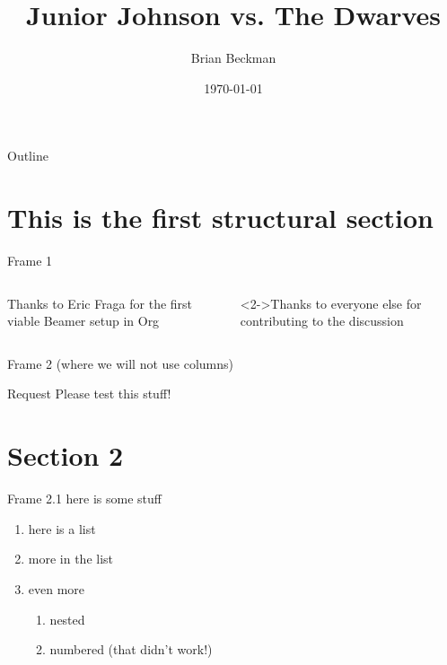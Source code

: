 \documentclass[presentation]{beamer}
\author{Brian Beckman}
\date{\today}
\title{Junior Johnson vs. The Dwarves}
\begin{document}
\maketitle
\begin{frame}{Outline}
\tableofcontents
\end{frame}


\section{This is the first structural section}
\label{sec:org176f1c9}

\begin{frame}[label={sec:orgf76da37}]{Frame 1}
\begin{columns}
\begin{column}{0.48\columnwidth}
\begin{block}{Thanks to Eric Fraga}
for the first viable Beamer setup in Org
\end{block}
\end{column}
\begin{column}{0.48\columnwidth}
\begin{block}<2->{Thanks to everyone else}
for contributing to the discussion
\end{block}
\end{column}
\end{columns}
\end{frame}
\begin{frame}[label={sec:orgcac18ba}]{Frame 2 (where we will not use columns)}
\begin{block}{Request}
Please test this stuff!
\end{block}
\end{frame}

\section{Section 2}
\label{sec:org18c9e16}

\begin{frame}[label={sec:org8dc69cc}]{Frame 2.1}
here is some stuff
\begin{enumerate}
\item here is a list
\item more in the list
\item even more
\begin{enumerate}
\item nested
\item numbered (that didn't work!)
\end{enumerate}
\end{enumerate}
\end{frame}
\end{document}
